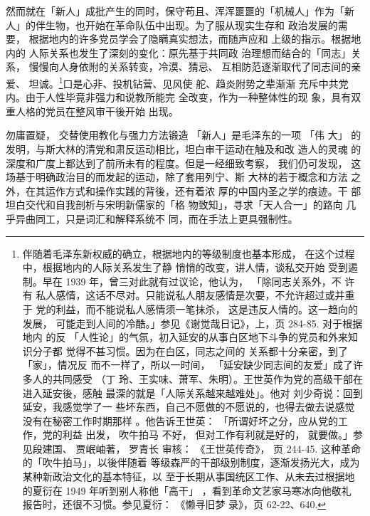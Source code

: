 然而就在「新人」成批产生的同时，保守苟且、浑浑噩噩的「机械人」作为「新
人」的伴生物，也开始在革命队伍中出现。为了服从现实生存和 政治发展的需要，
根据地内的许多党员学会了隐瞒真实想法，而随声应和 上级的指示。根据地内的
人际关系也发生了深刻的变化：原先基于共同政 治理想而结合的「同志」关系，
慢慢向人身依附的关系转变，冷漠、猜忌、 互相防范逐渐取代了同志间的亲爱、
坦诚。\footnote{ 伴随着毛泽东新权威的确立，根据地内的等级制度也基本形成，
在这个过程中，根据地内的人际关系发生了静 悄悄的改变，讲人情，谈私交开始
受到遏制。早在 1939 年，曾三对此就有过议论，他认为， 「除同志关系外，不
许有 私人感情，这话不尽对。只能说私人朋友感情是次要，不允许超过或并重于
党的利益，而不能说私人感情须一笔抹杀， 这是违反人情的。这一趋向的发展，
可能走到人间的冷酷。」参见《谢觉哉日记》，上，页 284-85. 对于根据地内
的反 「人性论」的气氛，初入延安的从事白区地下斗争的党员和外来知识分子都
觉得不甚习惯。因为在白区，同志之间的 关系都十分亲密，到了「家」，情况反
而不一样了，所以一时间， 「延安缺少同志间的友爱」成了许多人的共同感受
（丁 玲、王实味、萧军、朱明）。王世英作为党的高级干部在进入延安後，感触
最深的就是「人际关系越来越难处」。他对 刘少奇说：回到延安，我感觉学了一
些坏东西，自己不愿做的不愿说的，也得去做去说感觉没有在秘密工作时期那样
。他告诉王世英： 「所谓好坏之分，应从党的工作，党的利益 出发， 吹牛拍马
不好， 但对工作有利就是好的， 就要做。」参见段建国、 贾岷岫著， 罗青长
审核： 《王世英传奇》， 页 244-45.  这种革命的「吹牛拍马」，以後伴随着
等级森严的干部级别制度，逐渐发扬光大，成为某种新政治文化的基本特征，以
至于长期从事国统区工作、从未去过根据地的夏衍在 1949 年听到别人称他「高干」
，看到革命文艺家马寒冰向他敬礼 报告时，还很不习惯。参见夏衍： 《懒寻旧梦
录》，页 62-22、640.  }口是心非、投机钻营、见风使 舵、趋炎附势之辈渐渐
充斥中共党内。由于人性毕竟非强力和说教所能完 全改变，作为一种整体性的现
象，具有双重人格的党员在整风审干後开始 出现。

勿庸置疑， 交替使用教化与强力方法锻造 「新人」是毛泽东的一项 「伟 大」
的发明，与斯大林的清党和肃反运动相比，坦白审干运动在触及和改 造人的灵魂
的深度和广度上都达到了前所未有的程度。但是一经细致考察， 我们仍可发现，
这场基于明确政治目的而发起的运动，除了套用列宁、斯 大林的若于概念和方法
之外，在其运作方式和操作实践的背後，还有着浓 厚的中国内圣之学的痕迹。干
部坦白交代和自我剖析与宋明新儒家的「格 物致知」，寻求「天人合一」的路向
几乎异曲同工，只是词汇和解释系统不 同，而在手法上更具强制性。
